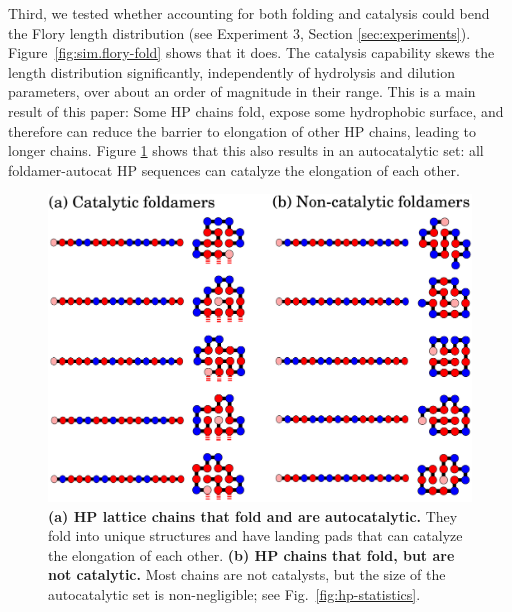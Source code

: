 \documentclass[5p,times]{elsarticle}
\begin{document}
Third, we tested whether accounting for both folding and catalysis could bend the Flory length 
distribution (see Experiment 3, Section \ref{sec:experiments}).  Figure~\ref{fig:sim.flory-fold} 
shows that it does. 
 The 
catalysis capability skews the length distribution significantly, independently of hydrolysis and 
dilution parameters, over about an order of magnitude in their range.  This is a main result of this 
paper:  Some HP chains fold, expose some hydrophobic surface, and therefore can reduce the barrier 
to elongation of other HP chains, leading to longer chains.  Figure \ref{fig:fold-cat} shows that 
this also results in an autocatalytic set: all foldamer-autocat HP sequences can catalyze the 
elongation of each other.
\begin{figure}[htb!]
  \centering
  \includegraphics[width=\columnwidth]{pictures/fold-cat.pdf} 
  \caption{\footnotesize{\textbf{(a) HP lattice chains that fold and are autocatalytic.}  They fold 
into unique structures and have landing pads that can catalyze the elongation of each other.  
\textbf{(b) HP chains that fold, but are not catalytic.}  Most chains are not catalysts, but the 
size of 
the autocatalytic set is non-negligible; see Fig.~\ref{fig:hp-statistics}.}}
  \label{fig:fold-cat}
\end{figure}
\end{document}
